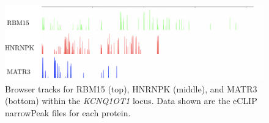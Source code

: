 \begin{figure}[h!]
\centering
\includegraphics[width=\textwidth]{images/kcnproteins.pdf}
\caption[\emph{KCNQ1OT1} RBM15, HNRNPK, and MATR3 eCLIP tracks]{Browser tracks for RBM15 (top), HNRNPK (middle), and MATR3 (bottom) within the \emph{KCNQ1OT1} locus. Data shown are the eCLIP narrowPeak files for each protein.}
\label{fig:kcnproteins}
\end{figure}

